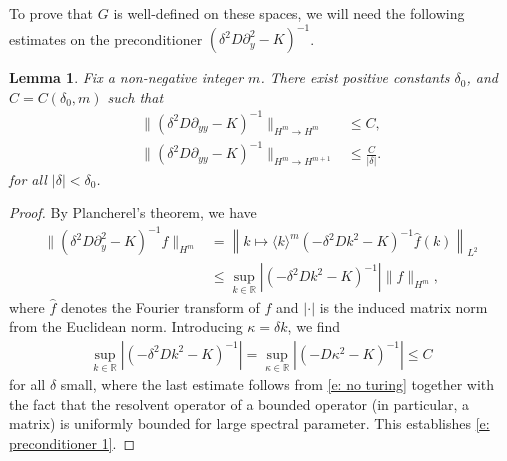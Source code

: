 \documentclass[11pt]{article}
\newcommand{\R}{\mathbb{R}}
\newtheorem{lemma}[prop]{Lemma}
\numberwithin{equation}{section}
\numberwithin{prop}{section}
\begin{document}
To prove that $G$ is well-defined on these spaces, we will need the following estimates on the preconditioner $(\delta^2 D \partial_y^2 - K)^{-1}$. 
\begin{lemma}
	Fix a non-negative integer $m$. There exist positive constants $\delta_0$, and $C = C(\delta_0, m)$ such that
	\begin{align}
		\| (\delta^2 D \partial_{yy} - K)^{-1} \|_{H^m \to H^m} &\leq C, \label{e: preconditioner 1} \\
		\| (\delta^2 D \partial_{yy} - K)^{-1} \|_{H^m \to H^{m+1}} &\leq \frac{C}{|\delta|}. \label{e: preconditioner 2} 
	\end{align}
	for all $|\delta| < \delta_0$.
\end{lemma}
\begin{proof}
	By Plancherel's theorem, we have
	\begin{align}
		\| (\delta^2 D \partial_y^2 - K)^{-1} f \|_{H^m} &= \left\| k \mapsto \langle k \rangle^m (-\delta^2 D k^2 - K)^{-1} \hat{f} (k) \right\|_{L^2} \\
		&\leq \sup_{k \in \R} | (-\delta^2 D k^2 - K)^{-1} | \| f \|_{H^m},
	\end{align}
	where $\hat{f}$ denotes the Fourier transform of $f$ and $|\cdot|$ is the induced matrix norm from the Euclidean norm. Introducing $\kappa = \delta k$, we find
	\begin{align}
		\sup_{k \in \R} | (-\delta^2 D k^2 - K)^{-1}| = \sup_{\kappa \in \R} | (- D \kappa^2 - K)^{-1}| \leq C
	\end{align}
	for all $\delta$ small, where the last estimate follows from \eqref{e: no turing} together with the fact that the resolvent operator of a bounded operator (in particular, a matrix) is uniformly bounded for large spectral parameter. This establishes \eqref{e: preconditioner 1}. 
	

\end{proof}
\end{document}
